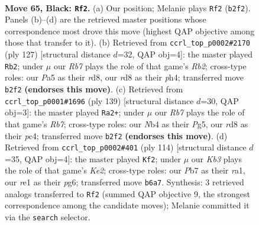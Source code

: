 \documentclass[11pt]{article}
\begin{document}
\clearpage

\begin{figure}[p]\centering
\begin{subfigure}{0.46\textwidth}\centering
\resizebox{\linewidth}{!}{%
\newchessgame
\chessboard[
  setfen={3R4/1p5p/1k4pP/p4p2/1n3P2/7K/1r6/4R3 b - - 18 65},
  showmover=false,
  pgfstyle=straightmove, color=movearrow, markmove={b2-f2}
]}
\caption{}
\end{subfigure}\hfill
\begin{subfigure}{0.46\textwidth}\centering
\resizebox{\linewidth}{!}{%
\newchessgame
\chessboard[
  setfen={3R4/1r2npk1/4p3/4Pp2/5P1P/8/2NB1K2/8 b - - 20 64},
  showmover=false,
  pgfstyle=straightmove, color=movearrow, markmove={b7-b2}
]}
\caption{}
\end{subfigure}
\\[4pt]
\begin{subfigure}{0.46\textwidth}\centering
\resizebox{\linewidth}{!}{%
\newchessgame
\chessboard[
  setfen={8/5k2/P4p2/5ppp/K1P5/6P1/1r6/4R3 b - - 2 70},
  showmover=false,
  pgfstyle=straightmove, color=movearrow, markmove={b2-a2}
]}
\caption{}
\end{subfigure}\hfill
\begin{subfigure}{0.46\textwidth}\centering
\resizebox{\linewidth}{!}{%
\newchessgame
\chessboard[
  setfen={8/8/6pk/5p2/5P1p/4P2P/1R2K1P1/r7 w - - 40 58},
  showmover=false,
  pgfstyle=straightmove, color=movearrow, markmove={e2-f2}
]}
\caption{}
\end{subfigure}
\caption{\textbf{Move 65, Black: \texttt{Rf2}.} (a) Our position; Melanie plays \texttt{Rf2} (\texttt{b2f2}). Panels (b)--(d) are the retrieved master positions whose correspondence most drove this move (highest QAP objective among those that transfer to it). (b) Retrieved from \texttt{ccrl\_top\_p0002\#2170} (ply 127) [structural distance $d$=32, QAP obj=4]: the master played \texttt{Rb2}; under $\mu$ our \emph{Rb7} plays the role of that game's \emph{Rb2}; cross-type roles: our \emph{P}a5 as their \emph{r}d8, our \emph{r}d8 as their \emph{p}h4; transferred move \texttt{b2f2} \textbf{(endorses this move)}. (c) Retrieved from \texttt{ccrl\_top\_p0001\#1696} (ply 139) [structural distance $d$=30, QAP obj=3]: the master played \texttt{Ra2+}; under $\mu$ our \emph{Rb7} plays the role of that game's \emph{Rb7}; cross-type roles: our \emph{N}b4 as their \emph{P}g5, our \emph{r}d8 as their \emph{p}c4; transferred move \texttt{b2f2} \textbf{(endorses this move)}. (d) Retrieved from \texttt{ccrl\_top\_p0002\#401} (ply 114) [structural distance $d$=35, QAP obj=4]: the master played \texttt{Kf2}; under $\mu$ our \emph{Kb3} plays the role of that game's \emph{Ke2}; cross-type roles: our \emph{P}b7 as their \emph{r}a1, our \emph{r}e1 as their \emph{p}g6; transferred move \texttt{b6a7}. Synthesis: 3 retrieved analogs transferred to \texttt{Rf2} (summed QAP objective 9, the strongest correspondence among the candidate moves); Melanie committed it via the \texttt{search} selector.}
\label{fig:thought-m129}
\end{figure}
\end{document}

